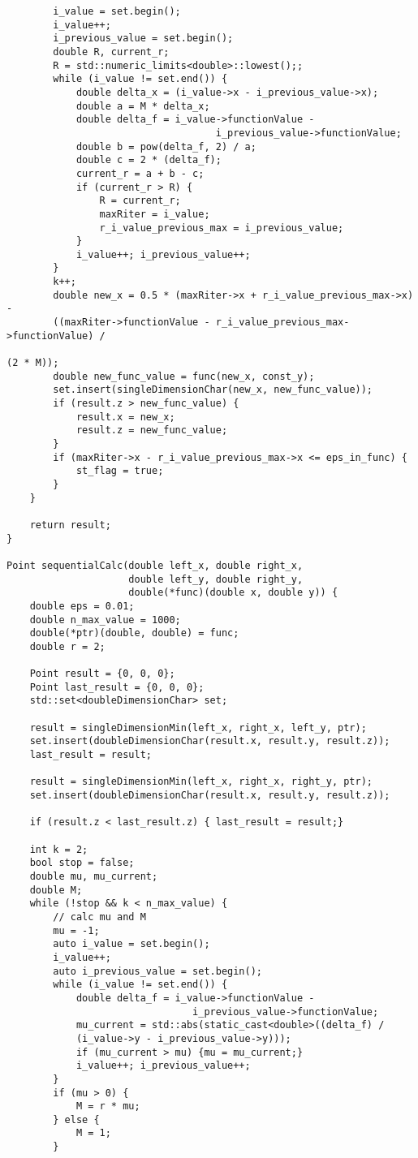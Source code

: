 \documentclass{report}
\begin{document}
\begin{lstlisting}
        i_value = set.begin();
        i_value++;
        i_previous_value = set.begin();
        double R, current_r;
        R = std::numeric_limits<double>::lowest();;
        while (i_value != set.end()) {
            double delta_x = (i_value->x - i_previous_value->x);
            double a = M * delta_x;
            double delta_f = i_value->functionValue -
                                    i_previous_value->functionValue;
            double b = pow(delta_f, 2) / a;
            double c = 2 * (delta_f);
            current_r = a + b - c;
            if (current_r > R) {
                R = current_r;
                maxRiter = i_value;
                r_i_value_previous_max = i_previous_value;
            }
            i_value++; i_previous_value++;
        }
        k++;
        double new_x = 0.5 * (maxRiter->x + r_i_value_previous_max->x) -
        ((maxRiter->functionValue - r_i_value_previous_max->functionValue) /
                                                                     (2 * M));
        double new_func_value = func(new_x, const_y);
        set.insert(singleDimensionChar(new_x, new_func_value));
        if (result.z > new_func_value) {
            result.x = new_x;
            result.z = new_func_value;
        }
        if (maxRiter->x - r_i_value_previous_max->x <= eps_in_func) {
            st_flag = true;
        }
    }

    return result;
}

Point sequentialCalc(double left_x, double right_x,
                     double left_y, double right_y,
                     double(*func)(double x, double y)) {
    double eps = 0.01;
    double n_max_value = 1000;
    double(*ptr)(double, double) = func;
    double r = 2;

    Point result = {0, 0, 0};
    Point last_result = {0, 0, 0};
    std::set<doubleDimensionChar> set;

    result = singleDimensionMin(left_x, right_x, left_y, ptr);
    set.insert(doubleDimensionChar(result.x, result.y, result.z));
    last_result = result;

    result = singleDimensionMin(left_x, right_x, right_y, ptr);
    set.insert(doubleDimensionChar(result.x, result.y, result.z));

    if (result.z < last_result.z) { last_result = result;}

    int k = 2;
    bool stop = false;
    double mu, mu_current;
    double M;
    while (!stop && k < n_max_value) {
        // calc mu and M
        mu = -1;
        auto i_value = set.begin();
        i_value++;
        auto i_previous_value = set.begin();
        while (i_value != set.end()) {
            double delta_f = i_value->functionValue -
                                i_previous_value->functionValue;
            mu_current = std::abs(static_cast<double>((delta_f) /
            (i_value->y - i_previous_value->y)));
            if (mu_current > mu) {mu = mu_current;}
            i_value++; i_previous_value++;
        }
        if (mu > 0) {
            M = r * mu;
        } else {
            M = 1;
        }


\end{lstlisting}
\end{document}
